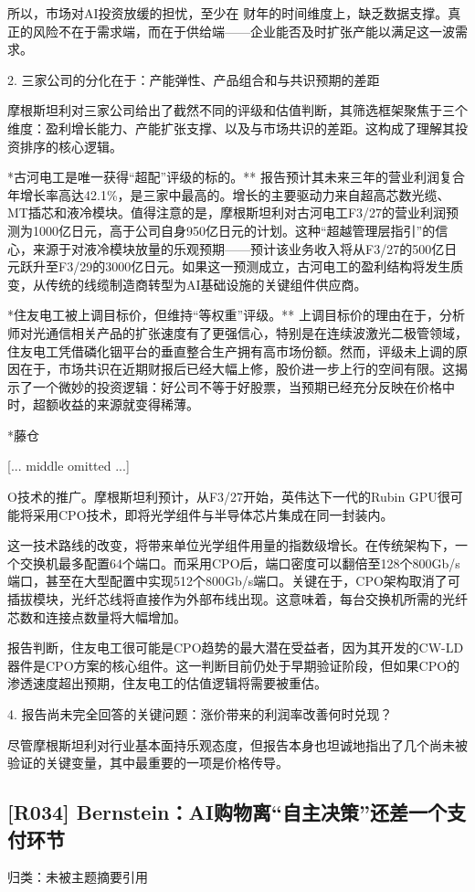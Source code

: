 \documentclass[11pt]{ctexart}
\begin{document}
所以，市场对AI投资放缓的担忧，至少在 财年的时间维度上，缺乏数据支撑。真正的风险不在于需求端，而在于供给端——企业能否及时扩张产能以满足这一波需求。

2. 三家公司的分化在于：产能弹性、产品组合和与共识预期的差距

摩根斯坦利对三家公司给出了截然不同的评级和估值判断，其筛选框架聚焦于三个维度：盈利增长能力、产能扩张支撑、以及与市场共识的差距。这构成了理解其投资排序的核心逻辑。

*古河电工是唯一获得“超配”评级的标的。** 报告预计其未来三年的营业利润复合年增长率高达42.1\%，是三家中最高的。增长的主要驱动力来自超高芯数光缆、MT插芯和液冷模块。值得注意的是，摩根斯坦利对古河电工F3/27的营业利润预测为1000亿日元，高于公司自身950亿日元的计划。这种“超越管理层指引”的信心，来源于对液冷模块放量的乐观预期——预计该业务收入将从F3/27的500亿日元跃升至F3/29的3000亿日元。如果这一预测成立，古河电工的盈利结构将发生质变，从传统的线缆制造商转型为AI基础设施的关键组件供应商。

*住友电工被上调目标价，但维持“等权重”评级。** 上调目标价的理由在于，分析师对光通信相关产品的扩张速度有了更强信心，特别是在连续波激光二极管领域，住友电工凭借磷化铟平台的垂直整合生产拥有高市场份额。然而，评级未上调的原因在于，市场共识在近期财报后已经大幅上修，股价进一步上行的空间有限。这揭示了一个微妙的投资逻辑：好公司不等于好股票，当预期已经充分反映在价格中时，超额收益的来源就变得稀薄。

*藤仓

[... middle omitted ...]

O技术的推广。摩根斯坦利预计，从F3/27开始，英伟达下一代的Rubin GPU很可能将采用CPO技术，即将光学组件与半导体芯片集成在同一封装内。

这一技术路线的改变，将带来单位光学组件用量的指数级增长。在传统架构下，一个交换机最多配置64个端口。而采用CPO后，端口密度可以翻倍至128个800Gb/s端口，甚至在大型配置中实现512个800Gb/s端口。关键在于，CPO架构取消了可插拔模块，光纤芯线将直接作为外部布线出现。这意味着，每台交换机所需的光纤芯数和连接点数量将大幅增加。

报告判断，住友电工很可能是CPO趋势的最大潜在受益者，因为其开发的CW-LD器件是CPO方案的核心组件。这一判断目前仍处于早期验证阶段，但如果CPO的渗透速度超出预期，住友电工的估值逻辑将需要被重估。

4. 报告尚未完全回答的关键问题：涨价带来的利润率改善何时兑现？

尽管摩根斯坦利对行业基本面持乐观态度，但报告本身也坦诚地指出了几个尚未被验证的关键变量，其中最重要的一项是价格传导。

\subsection{[R034] Bernstein：AI购物离“自主决策”还差一个支付环节}
{\small\color{refgray}归类：未被主题摘要引用}
\end{document}
